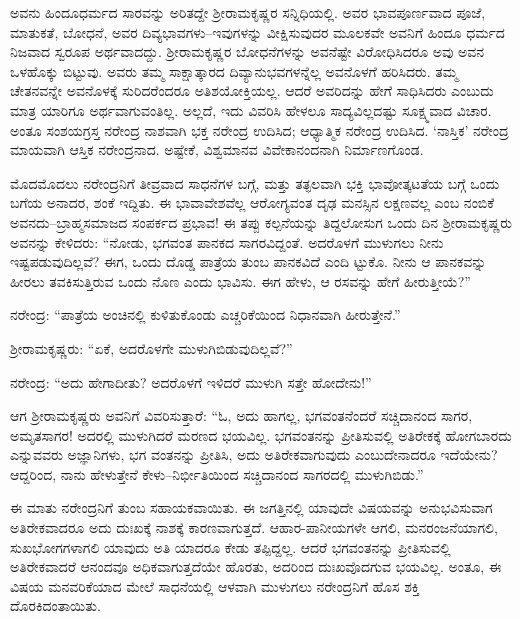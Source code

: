 ಅವನು ಹಿಂದೂಧರ್ಮದ ಸಾರವನ್ನು ಅರಿತದ್ದೇ ಶ್ರೀರಾಮಕೃಷ್ಣರ ಸನ್ನಿಧಿಯಲ್ಲಿ. ಅವರ ಭಾವಪೂರ್ಣವಾದ ಪೂಜೆ, ಮಾತುಕತೆ, ಬೋಧನೆ, ಅವರ ದಿವ್ಯಭಾವಗಳು–ಇವುಗಳನ್ನು ವೀಕ್ಷಿಸುವುದರ ಮೂಲಕವೇ ಅವನಿಗೆ ಹಿಂದೂ ಧರ್ಮದ ನಿಜವಾದ ಸ್ವರೂಪ ಅರ್ಥವಾದದ್ದು. ಶ್ರೀರಾಮಕೃಷ್ಣರ ಬೋಧನೆಗಳನ್ನು ಅವನೆಷ್ಟೇ ವಿರೋಧಿಸಿದರೂ ಅವು ಅವನ ಒಳಹೊಕ್ಕು ಬಿಟ್ಟುವು. ಅವರು ತಮ್ಮ ಸಾಕ್ಷಾತ್ಕಾರದ ದಿವ್ಯಾನುಭವಗಳನ್ನೆಲ್ಲ ಅವನೊಳಗೆ ಹರಿಸಿದರು. ತಮ್ಮ ಚೇತನವನ್ನೇ ಅವನೊಳಕ್ಕೆ ಸುರಿದರೆಂದರೂ ಅತಿಶಯೋಕ್ತಿಯಲ್ಲ. ಆದರೆ ಅವರಿದನ್ನು ಹೇಗೆ ಸಾಧಿಸಿದರು ಎಂಬುದು ಮಾತ್ರ ಯಾರಿಗೂ ಅರ್ಥವಾಗುವಂತಿಲ್ಲ. ಅಲ್ಲದೆ, ಇದು ವಿವರಿಸಿ ಹೇಳಲೂ ಸಾದ್ಯವಿಲ್ಲದಷ್ಟು ಸೂಕ್ಷ್ಮವಾದ ವಿಚಾರ. ಅಂತೂ ಸಂಶಯಗ್ರಸ್ತ ನರೇಂದ್ರ ನಾಶವಾಗಿ ಭಕ್ತ ನರೇಂದ್ರ ಉದಿಸಿದ; ಆಧ್ಯಾತ್ಮಿಕ ನರೇಂದ್ರ ಉದಿಸಿದ. ‘ನಾಸ್ತಿಕ’ ನರೇಂದ್ರ ಮಾಯವಾಗಿ ಆಸ್ತಿಕ ನರೇಂದ್ರನಾದ. ಅಷ್ಟೇಕೆ, ವಿಶ್ವಮಾನವ ವಿವೇಕಾನಂದನಾಗಿ ನಿರ್ಮಾಣಗೊಂಡ.

ಮೊದಮೊದಲು ನರೇಂದ್ರನಿಗೆ ತೀವ್ರವಾದ ಸಾಧನೆಗಳ ಬಗ್ಗೆ, ಮತ್ತು ತತ್ಫಲವಾಗಿ ಭಕ್ತಿ ಭಾವೋತ್ಕಟತೆಯ ಬಗ್ಗೆ ಒಂದು ಬಗೆಯ ಅನಾದರ, ಶಂಕೆ ಇದ್ದಿತು. ಈ ಭಾವಾವೇಶವೆಲ್ಲ ಆರೋಗ್ಯವಂತ ದೃಢ ಮನಸ್ಸಿನ ಲಕ್ಷಣವಲ್ಲ ಎಂಬ ನಂಬಿಕೆ ಅವನದು–ಬ್ರಾಹ್ಮಸಮಾಜದ ಸಂಪರ್ಕದ ಪ್ರಭಾವ! ಈ ತಪ್ಪು ಕಲ್ಪನೆಯನ್ನು ತಿದ್ದಲೋಸುಗ ಒಂದು ದಿನ ಶ್ರೀರಾಮಕೃಷ್ಣರು ಅವನನ್ನು ಕೇಳಿದರು: “ನೋಡು, ಭಗವಂತ ಪಾನಕದ ಸಾಗರವಿದ್ದಂತೆ. ಅದರೊಳಗೆ ಮುಳುಗಲು ನೀನು ಇಷ್ಟಪಡುವುದಿಲ್ಲವೆ? ಈಗ, ಒಂದು ದೊಡ್ಡ ಪಾತ್ರೆಯ ತುಂಬ ಪಾನಕವಿದೆ ಎಂದಿ ಟ್ಟುಕೊ. ನೀನು ಆ ಪಾನಕವನ್ನು ಹೀರಲು ತವಕಿಸುತ್ತಿರುವ ಒಂದು ನೊಣ ಎಂದು ಭಾವಿಸು. ಈಗ ಹೇಳು, ಆ ರಸವನ್ನು ಹೇಗೆ ಹೀರುತ್ತೀಯೆ?”

ನರೇಂದ್ರ: “ಪಾತ್ರೆಯ ಅಂಚಿನಲ್ಲಿ ಕುಳಿತುಕೊಂಡು ಎಚ್ಚರಿಕೆಯಿಂದ ನಿಧಾನವಾಗಿ ಹೀರುತ್ತೇನೆ.”

ಶ್ರೀರಾಮಕೃಷ್ಣರು: “ಏಕೆ, ಅದರೊಳಗೇ ಮುಳುಗಿಬಿಡುವುದಿಲ್ಲವೆ?”

ನರೇಂದ್ರ: “ಅದು ಹೇಗಾದೀತು? ಅದರೊಳಗೆ ಇಳಿದರೆ ಮುಳುಗಿ ಸತ್ತೇ ಹೋದೇನು!”

ಆಗ ಶ್ರೀರಾಮಕೃಷ್ಣರು ಅವನಿಗೆ ವಿವರಿಸುತ್ತಾರೆ: “ಓ, ಅದು ಹಾಗಲ್ಲ, ಭಗವಂತನೆಂದರೆ ಸಚ್ಚಿದಾನಂದ ಸಾಗರ, ಅಮೃತಸಾಗರ! ಅದರಲ್ಲಿ ಮುಳುಗಿದರೆ ಮರಣದ ಭಯವಿಲ್ಲ. ಭಗವಂತನನ್ನು ಪ್ರೀತಿಸುವಲ್ಲಿ ಅತಿರೇಕಕ್ಕೆ ಹೋಗಬಾರದು ಎನ್ನುವವರು ಅಜ್ಞಾನಿಗಳು, ಭಗ ವಂತನನ್ನು ಪ್ರೀತಿಸಿ, ಅದು ಅತಿರೇಕವಾಗುವುದು ಎಂಬುದೇನಾದರೂ ಇದೆಯೇನು? ಆದ್ದರಿಂದ, ನಾನು ಹೇಳುತ್ತೇನೆ ಕೇಳು–ನಿರ್ಭೀತಿಯಿಂದ ಸಚ್ಚಿದಾನಂದ ಸಾಗರದಲ್ಲಿ ಮುಳುಗಿಬಿಡು.”

ಈ ಮಾತು ನರೇಂದ್ರನಿಗೆ ತುಂಬ ಸಹಾಯಕವಾಯಿತು. ಈ ಜಗತ್ತಿನಲ್ಲಿ ಯಾವುದೇ ವಿಷಯವನ್ನು ಅನುಭವಿಸುವಾಗ ಅತಿರೇಕವಾದರೂ ಅದು ದುಃಖಕ್ಕೆ ನಾಶಕ್ಕೆ ಕಾರಣವಾಗುತ್ತದೆ. ಆಹಾರ-ಪಾನೀಯಗಳೇ ಆಗಲಿ, ಮನರಂಜನೆಯಾಗಲಿ, ಸುಖಭೋಗಗಳಾಗಲಿ ಯಾವುದು ಅತಿ ಯಾದರೂ ಕೇಡು ತಪ್ಪಿದ್ದಲ್ಲ. ಆದರೆ ಭಗವಂತನನ್ನು ಪ್ರೀತಿಸುವಲ್ಲಿ ಅತಿರೇಕವಾದರೆ ಆನಂದವೂ ಅಧಿಕವಾಗುತ್ತದೆಯೇ ಹೊರತು, ಅದರಿಂದ ದುಃಖವೊದಗುವ ಭಯವಿಲ್ಲ. ಅಂತೂ, ಈ ವಿಷಯ ಮನವರಿಕೆಯಾದ ಮೇಲೆ ಸಾಧನೆಯಲ್ಲಿ ಆಳವಾಗಿ ಮುಳುಗಲು ನರೇಂದ್ರನಿಗೆ ಹೊಸ ಶಕ್ತಿ ದೊರಕಿದಂತಾಯಿತು.


